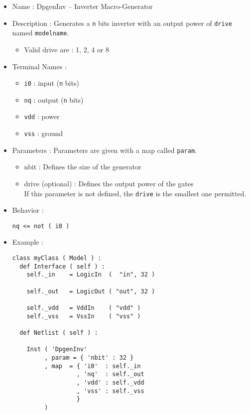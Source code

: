 \begin{itemize}
    \item Name : DpgenInv -- Inverter Macro-Generator
    \item Description : Generates a \verb-n- bits inverter with an output power of \verb-drive- named \verb-modelname-.
    \begin{itemize}
        \item Valid drive are : 1, 2, 4 or 8
    \end{itemize}
    \item Terminal Names :
    \begin{itemize}
        \item \verb-i0- : input (\verb-n- bits)
        \item \verb-nq- : output (\verb-n- bits)
        \item \verb-vdd- : power
        \item \verb-vss- : ground
    \end{itemize}
    \item Parameters : Parameters are given with a map called \verb-param-.
    \begin{itemize}
        \item nbit : Defines the size of the generator
        \item drive (optional) : Defines the output power of the gates\\If this parameter is not defined, the \verb-drive- is the smallest one permitted.
    \end{itemize}
    \item Behavior :
\begin{verbatim}
nq <= not ( i0 )
\end{verbatim}
    \item Example :
\begin{verbatim}
class myClass ( Model ) :
  def Interface ( self ) :
    self._in    = LogicIn  (  "in", 32 )
    
    self._out   = LogicOut ( "out", 32 )

    self._vdd   = VddIn    ( "vdd" )
    self._vss   = VssIn    ( "vss" )
    
  def Netlist ( self ) :
      
    Inst ( 'DpgenInv'
         , param = { 'nbit' : 32 }
         , map  = { 'i0'  : self._in
                  , 'nq'  : self._out
                  , 'vdd' : self._vdd
                  , 'vss' : self._vss
                  }
         )
\end{verbatim}
\end{itemize}
